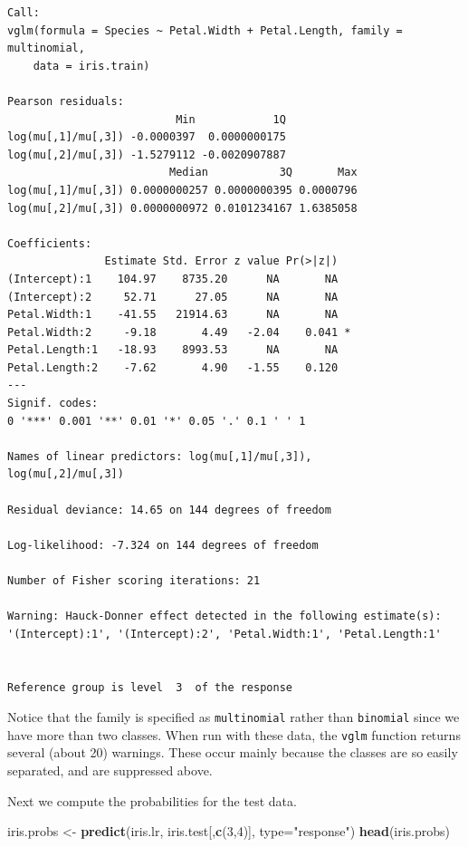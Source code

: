 \documentclass[
]{krantz}
\makeatletter
\newenvironment{Shaded}{\begin{snugshade}}{\end{snugshade}}
\newcommand{\DataTypeTok}[1]{\textcolor[rgb]{0.27,0.27,0.27}{#1}}
\newcommand{\DecValTok}[1]{\textcolor[rgb]{0.06,0.06,0.06}{#1}}
\newcommand{\KeywordTok}[1]{\textcolor[rgb]{0.27,0.27,0.27}{\textbf{#1}}}
\newcommand{\NormalTok}[1]{#1}
\newcommand{\StringTok}[1]{\textcolor[rgb]{0.5,0.5,0.5}{#1}}
\newenvironment{kframe}{%
\medskip{}
\setlength{\fboxsep}{.8em}
 \def\at@end@of@kframe{}%
 \ifinner\ifhmode%
  \def\at@end@of@kframe{\end{minipage}}%
  \begin{minipage}{\columnwidth}%
 \fi\fi%
 \def\FrameCommand##1{\hskip\@totalleftmargin \hskip-\fboxsep
 \colorbox{shadecolor}{##1}\hskip-\fboxsep
     \hskip-\linewidth \hskip-\@totalleftmargin \hskip\columnwidth}%
 \MakeFramed {\advance\hsize-\width
   \@totalleftmargin\z@ \linewidth\hsize
   \@setminipage}}%
 {\par\unskip\endMakeFramed%
 \at@end@of@kframe}
\renewenvironment{Shaded}{\begin{kframe}}{\end{kframe}}
\makeatother
\begin{document}
\begin{verbatim}
Call:
vglm(formula = Species ~ Petal.Width + Petal.Length, family = multinomial, 
    data = iris.train)

Pearson residuals:
                          Min            1Q
log(mu[,1]/mu[,3]) -0.0000397  0.0000000175
log(mu[,2]/mu[,3]) -1.5279112 -0.0020907887
                         Median           3Q       Max
log(mu[,1]/mu[,3]) 0.0000000257 0.0000000395 0.0000796
log(mu[,2]/mu[,3]) 0.0000000972 0.0101234167 1.6385058

Coefficients: 
               Estimate Std. Error z value Pr(>|z|)  
(Intercept):1    104.97    8735.20      NA       NA  
(Intercept):2     52.71      27.05      NA       NA  
Petal.Width:1    -41.55   21914.63      NA       NA  
Petal.Width:2     -9.18       4.49   -2.04    0.041 *
Petal.Length:1   -18.93    8993.53      NA       NA  
Petal.Length:2    -7.62       4.90   -1.55    0.120  
---
Signif. codes:  
0 '***' 0.001 '**' 0.01 '*' 0.05 '.' 0.1 ' ' 1

Names of linear predictors: log(mu[,1]/mu[,3]), 
log(mu[,2]/mu[,3])

Residual deviance: 14.65 on 144 degrees of freedom

Log-likelihood: -7.324 on 144 degrees of freedom

Number of Fisher scoring iterations: 21 

Warning: Hauck-Donner effect detected in the following estimate(s):
'(Intercept):1', '(Intercept):2', 'Petal.Width:1', 'Petal.Length:1'


Reference group is level  3  of the response
\end{verbatim}

Notice that the family is specified as \texttt{multinomial} rather than \texttt{binomial} since we have more than two classes. When run with these data, the \texttt{vglm} function returns several (about 20) warnings. These occur mainly because the classes are so easily separated, and are suppressed above.

Next we compute the probabilities for the test data.

\begin{Shaded}
\begin{Highlighting}[]
\NormalTok{iris.probs \textless{}{-}}\StringTok{ }\KeywordTok{predict}\NormalTok{(iris.lr, iris.test[,}\KeywordTok{c}\NormalTok{(}\DecValTok{3}\NormalTok{,}\DecValTok{4}\NormalTok{)], }\DataTypeTok{type=}\StringTok{"response"}\NormalTok{)}
\KeywordTok{head}\NormalTok{(iris.probs)}
\end{Highlighting}
\end{Shaded}
\end{document}
